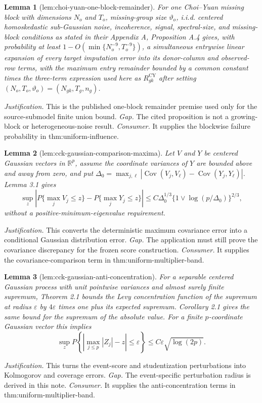 \documentclass{article}
\newtheorem{lemma}{Lemma}
\begin{document}
\begin{lemma}[lem:choi-yuan-one-block-remainder]\label{lem:choi-yuan-one-block-remainder}
For one Choi--Yuan missing block with dimensions \(N_o\) and \(T_o\), missing-group size \(\vartheta_o\), i.i.d. centered homoskedastic sub-Gaussian noise, incoherence, signal, spectral-size, and missing-block conditions as stated in their Appendix A, Proposition A.4 gives, with probability at least \(1-O(\min\{N_o^{-9},T_o^{-9}\})\), a simultaneous entrywise linear expansion of every target imputation error into its donor-column and observed-row terms, with the maximum entry remainder bounded by a common constant times the three-term expression used here as \(R_{gk}^{\mathrm{CY}}\) after setting \((N_o,T_o,\vartheta_o)=(N_{gk},T_g,n_g)\).
\end{lemma}
\par\smallskip\noindent \textit{Justification.} This is the published one-block remainder premise used only for the source-submodel finite union bound. \textit{Gap.} The cited proposition is not a growing-block or heterogeneous-noise result. \textit{Consumer.} It supplies the blockwise failure probability in thm:uniform-influence.

\begin{lemma}[lem:cck-gaussian-comparison-maxima]\label{lem:cck-gaussian-comparison-maxima}
Let \(V\) and \(Y\) be centered Gaussian vectors in \(\mathbb R^p\), assume the coordinate variances of \(Y\) are bounded above and away from zero, and put \(\Delta_0=\max_{j,\ell}|\operatorname{Cov}(V_j,V_\ell)-\operatorname{Cov}(Y_j,Y_\ell)|\).  Lemma 3.1 gives
\[
 \sup_z\left|P\{\max_jV_j\le z\}-P\{\max_jY_j\le z\}\right|
 \le C\Delta_0^{1/3}\{1\vee\log(p/\Delta_0)\}^{2/3},
\]
without a positive-minimum-eigenvalue requirement.
\end{lemma}
\par\smallskip\noindent \textit{Justification.} This converts the deterministic maximum covariance error into a conditional Gaussian distribution error. \textit{Gap.} The application must still prove the covariance discrepancy for the frozen score construction. \textit{Consumer.} It supplies the covariance-comparison term in thm:uniform-multiplier-band.

\begin{lemma}[lem:cck-gaussian-anti-concentration]\label{lem:cck-gaussian-anti-concentration}
For a separable centered Gaussian process with unit pointwise variances and almost surely finite supremum, Theorem 2.1 bounds the Levy concentration function of the supremum at radius \(\varepsilon\) by \(4\varepsilon\) times one plus its expected supremum.  Corollary 2.1 gives the same bound for the supremum of the absolute value.  For a finite \(p\)-coordinate Gaussian vector this implies
\[
 \sup_zP\left\{\left|\max_{j\le p}|Z_j|-z\right|\le\varepsilon\right\}
 \le C\varepsilon\sqrt{\log(2p)}.
\]
\end{lemma}
\par\smallskip\noindent \textit{Justification.} This turns the event-score and studentization perturbations into Kolmogorov and coverage errors. \textit{Gap.} The event-specific perturbation radius is derived in this note. \textit{Consumer.} It supplies the anti-concentration terms in thm:uniform-multiplier-band.
\end{document}
